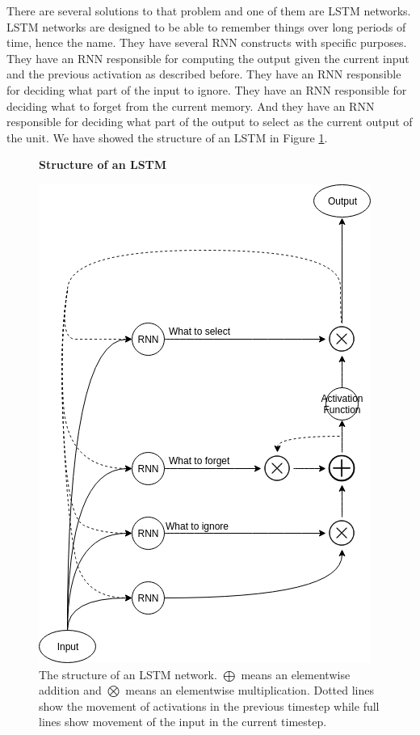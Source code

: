\begin{description}
        There are several solutions to that problem and one of them are
        \gls{LSTM} networks. \gls{LSTM} networks are designed to be able to
        remember things over long periods of time, hence the name. They have
        several \gls{RNN} constructs with specific purposes. They have an
        \gls{RNN} responsible for computing the output given the current input
        and the previous activation as described before. They have an \gls{RNN}
        responsible for deciding what part of the input to ignore. They have
        an \gls{RNN} responsible for deciding what to forget from the current
        memory. And they have an \gls{RNN} responsible for deciding what part of
        the output to select as the current output of the unit. We have showed
        the structure of an \gls{LSTM} in Figure \ref{fig:lstm}.

        \begin{figure}
            \centering
            \textbf{Structure of an \gls{LSTM}}\par\medskip
            \includegraphics[scale=0.5]{./pictures/method/LSTM.png}
            \caption{The structure of an \gls{LSTM} network. $\bigoplus$ means
                an elementwise addition and $\bigotimes$ means an elementwise
                multiplication. Dotted lines show the movement of activations in
                the previous timestep while full lines show movement of the
                input in the current timestep.}
            \label{fig:lstm}
        \end{figure}


\end{description}
